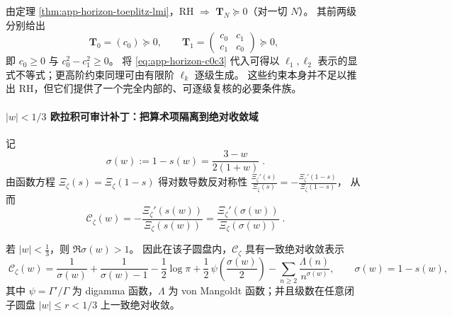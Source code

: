 \begin{remark}\label{rem:app-horizon-low-level-psd}
由定理 \ref{thm:app-horizon-toeplitz-lmi}，RH \(\Rightarrow\) \(\mathbf{T}_N\succeq 0\)（对一切 \(N\)）。
其前两级分别给出
\[
\mathbf{T}_0=(c_0)\succeq 0,
\qquad
\mathbf{T}_1=\begin{pmatrix}c_0&c_1\\c_1&c_0\end{pmatrix}\succeq 0,
\]
即 \(c_0\ge 0\) 与 \(c_0^2-c_1^2\ge 0\)。
将 \eqref{eq:app-horizon-c0c3} 代入可得以 \(\ell_1,\ell_2\) 表示的显式不等式；更高阶约束同理可由有限阶 \(\ell_k\) 逐级生成。
这些约束本身并不足以推出 RH，但它们提供了一个完全内部的、可逐级复核的必要条件族。
\end{remark}

\paragraph{\texorpdfstring{$|w|<1/3$}{|w|<1/3} 欧拉积可审计补丁：把算术项隔离到绝对收敛域}
记
\begin{equation}\label{eq:app-horizon-sigma-def}
\boxed{\;\sigma(w):=1-s(w)=\frac{3-w}{2(1+w)}\; }.
\end{equation}
由函数方程 \(\Xi_{\zeta}(s)=\Xi_{\zeta}(1-s)\) 得对数导数反对称性
\(
\frac{\Xi_{\zeta}'(s)}{\Xi_{\zeta}(s)}=-\frac{\Xi_{\zeta}'(1-s)}{\Xi_{\zeta}(1-s)}
\)，
从而
\begin{equation}\label{eq:app-horizon-fe-rewrite}
\boxed{\;
\mathscr{C}_{\zeta}(w)
=-\frac{\Xi_{\zeta}'(s(w))}{\Xi_{\zeta}(s(w))}
=\frac{\Xi_{\zeta}'(\sigma(w))}{\Xi_{\zeta}(\sigma(w))}\; }.
\end{equation}

\begin{theorem}\label{thm:app-horizon-euler-patch}
若 \(|w|<\frac13\)，则 \(\Re\sigma(w)>1\)。
因此在该子圆盘内，\(\mathscr{C}_{\zeta}\) 具有一致绝对收敛表示
\begin{equation}\label{eq:app-horizon-euler-patch}
\boxed{\;
\mathscr{C}_{\zeta}(w)=\frac{1}{\sigma(w)}+\frac{1}{\sigma(w)-1}
-\frac12\log\pi+\frac12\,\psi\!\left(\frac{\sigma(w)}{2}\right)
-\sum_{n\ge2}\frac{\Lambda(n)}{n^{\sigma(w)}},\qquad \sigma(w)=1-s(w),\;}
\end{equation}
其中 \(\psi=\Gamma'/\Gamma\) 为 digamma 函数，\(\Lambda\) 为 von Mangoldt 函数；并且级数在任意闭子圆盘 \(|w|\le r<1/3\) 上一致绝对收敛。
\end{theorem}

